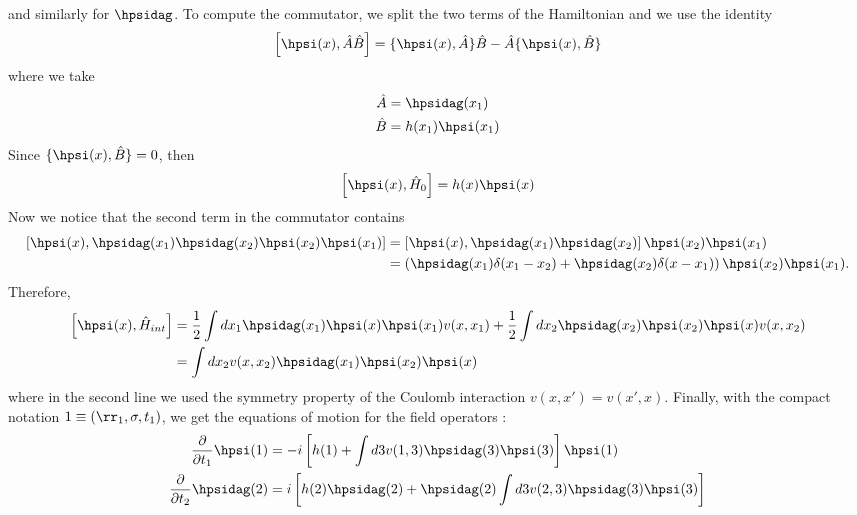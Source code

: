 and similarly for $\hpsidag$. To compute the commutator, we split the two terms of the Hamiltonian and we use the identity 
\begin{equation}
	\left[ \hpsi(x),\hat{A}\hat{B} \right] = \{ \hpsi(x),\hat{A} \}\hat{B} -  \hat{A}\{ \hpsi(x), \hat{B} \}
\end{equation}
where we take
\begin{align} 
\begin{split}
	\hat{A} &= \hpsidag(x_1) \\
	\hat{B} &= h(x_1) \hpsi(x_1)
\end{split}
\end{align}
Since $\{\hpsi(x),\hat{B}\} = 0$, then 
\begin{equation}
	\left[ \hpsi(x),\hat{H}_0\right] = h(x) \hpsi(x)
\end{equation}
Now we notice that the second term in the commutator contains 
\begin{align}
\begin{split}
	\left[ \hpsi(x), \hpsidag(x_1)\hpsidag(x_2)\hpsi(x_2)\hpsi(x_1) \right] &= \left[ \hpsi(x),\hpsidag(x_1)\hpsidag(x_2) \right] \hpsi(x_2)\hpsi(x_1) \\
	&= \left( \hpsidag(x_1) \delta(x_1-x_2) + \hpsidag(x_2)\delta(x-x_1) \right) \hpsi(x_2)\hpsi(x_1).
\end{split}
\end{align}
Therefore, 
\begin{align}
\begin{split}
	\left[ \hpsi(x),\hat{H}_{int} \right] &= \frac{1}{2} \int dx_1 \hpsidag(x_1)\hpsi(x)\hpsi(x_1) v(x,x_1) + \frac{1}{2} \int dx_2 \hpsidag(x_2)\hpsi(x_2)\hpsi(x) v(x,x_2) \\
	&= \int dx_2 v(x,x_2) \hpsidag(x_1) \hpsi(x_2) \hpsi(x)
\end{split}
\end{align}
where in the second line we used the symmetry property of the Coulomb interaction $v(x,x') = v(x',x)$.
Finally, with the compact notation $1 \equiv (\rr_1, \sigma, t_1)$, we get the equations of motion for the field operators :
\begin{align}
\begin{split}
	\frac{\partial}{\partial t_1} \hpsi(1) &= -i \left[ h(1) + \int d3 v(1,3) \hpsidag(3)\hpsi(3) \right] \hpsi(1) \\
	\frac{\partial}{\partial t_2} \hpsidag(2) &= i \left[ h(2)\hpsidag(2) + \hpsidag(2) \int d3 v(2,3) \hpsidag(3)\hpsi(3) \right]
\end{split}
\end{align}


		